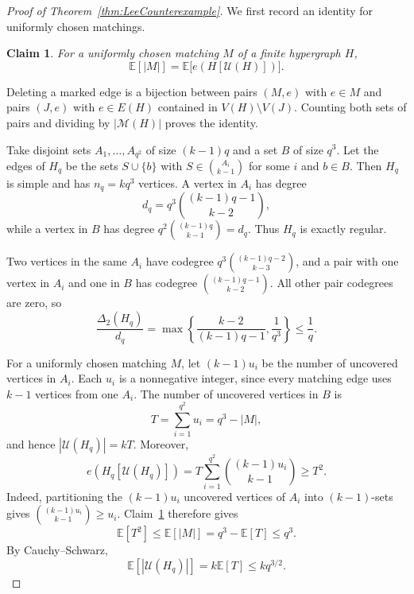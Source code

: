 \documentclass[11pt,reqno]{amsart}
\makeatletter
\numberwithin{equation}{section}
\theoremstyle{plain}
\newtheorem{claim}{Claim}[section]
\newenvironment{claimproof}[1][Proof]{\par
    \pushQED{\qed}%
    \renewcommand{\qedsymbol}{$\blacksquare$}
    \normalfont \topsep6\p@\@plus6\p@\relax
    \trivlist
    \item[\hskip\labelsep
    \textit{#1}\@addpunct{.}~]\ignorespaces
}{%
    \popQED\endtrivlist\@endpefalse
}
\theoremstyle{definition}
\newcommand{\calM}{\mathcal{M}}
\newcommand{\E}{\mathbb E}
\newcommand{\calU}{\mathcal U}
\makeatother
\begin{document}
\begin{proof}[Proof of Theorem~\ref{thm:LeeCounterexample}]
    We first record an identity for uniformly chosen matchings.
    \begin{claim}\label{clm:insertion}
        For a uniformly chosen matching $M$ of a finite hypergraph $H$,
        \[
            \E[|M|]=\E\bigl[e(H[\calU(H)])\bigr].
        \]
    \end{claim}
    \begin{claimproof}[Proof of Claim~\ref{clm:insertion}]
        Deleting a marked edge is a bijection between pairs $(M,e)$ with $e\in M$ and pairs $(J,e)$ with $e\in E(H)$ contained in $V(H)\setminus V(J)$.
        Counting both sets of pairs and dividing by $|\calM(H)|$ proves the identity.
    \end{claimproof}

    Take disjoint sets $A_1,\ldots,A_{q^2}$ of size $(k-1)q$ and a set $B$ of size $q^3$.
    Let the edges of $H_q$ be the sets $S\cup\{b\}$ with $S\in\binom{A_i}{k-1}$ for some $i$ and $b\in B$.
    Then $H_q$ is simple and has $n_q=kq^3$ vertices.
    A vertex in $A_i$ has degree
    \begin{equation}\label{eq:counterexample-degree}
        d_q=q^3\binom{(k-1)q-1}{k-2},
    \end{equation}
    while a vertex in $B$ has degree $q^2\binom{(k-1)q}{k-1}=d_q$.
    Thus $H_q$ is exactly regular.

    Two vertices in the same $A_i$ have codegree $q^3\binom{(k-1)q-2}{k-3}$, and a pair with one vertex in $A_i$ and one in $B$ has codegree $\binom{(k-1)q-1}{k-2}$.
    All other pair codegrees are zero, so
    \begin{equation}\label{eq:counterexample-codegree}
        \frac{\Delta_2(H_q)}{d_q}
        =\max\left\{\frac{k-2}{(k-1)q-1},\frac1{q^3}\right\}
        \le\frac1q.
    \end{equation}

    For a uniformly chosen matching $M$, let $(k-1)u_i$ be the number of uncovered vertices in $A_i$.
    Each $u_i$ is a nonnegative integer, since every matching edge uses $k-1$ vertices from one $A_i$.
    The number of uncovered vertices in $B$ is
    \[
        T=\sum_{i=1}^{q^2}u_i=q^3-|M|,
    \]
    and hence $|\calU(H_q)|=kT$.
    Moreover,
    \[
        e(H_q[\calU(H_q)])
        =T\sum_{i=1}^{q^2}\binom{(k-1)u_i}{k-1}
        \ge T^2.
    \]
    Indeed, partitioning the $(k-1)u_i$ uncovered vertices of $A_i$ into $(k-1)$-sets gives $\binom{(k-1)u_i}{k-1}\ge u_i$.
    Claim~\ref{clm:insertion} therefore gives
    \[
        \E[T^2]\le\E[|M|]=q^3-\E[T]\le q^3.
    \]
    By Cauchy--Schwarz,
    \begin{equation}\label{eq:counterexample-mean-vacancy}
        \E[|\calU(H_q)|]=k\E[T]\le kq^{3/2}.
    \end{equation}


\end{proof}
\end{document}
